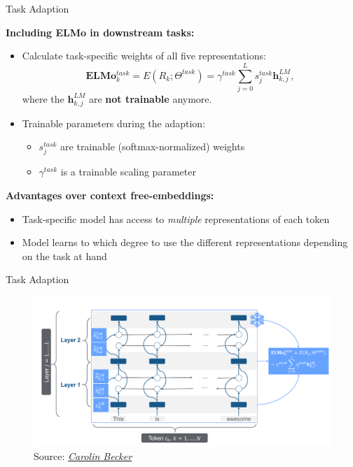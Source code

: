 \begin{vbframe}{Task Adaption}

\vfill

\textbf{Including ELMo in downstream tasks:}

	\begin{itemize}
		\item Calculate task-specific weights of all five representations:
					$$\mathbf{E} \mathbf{L} \mathbf{M} \mathbf{o}_{k}^{t a s k}=E\left(R_{k} ; \Theta^{t a s k}\right)=\gamma^{t a s k} \sum_{j=0}^{L} s_{j}^{t a s k} \mathbf{h}_{k, j}^{L M},$$
					where the $\mathbf{h}_{k, j}^{L M}$ are \textbf{not trainable} anymore.
		\item Trainable parameters during the adaption:
			\begin{itemize}
				\item $s_{j}^{t a s k}$ are trainable (softmax-normalized) weights
				\item $\gamma^{t a s k}$ is a trainable scaling parameter
			\end{itemize}
	\end{itemize}

	\textbf{Advantages over context free-embeddings:}

	\begin{itemize}
		\item Task-specific model has access to \textit{multiple} representations of each token
		\item Model learns to which degree to use the different representations depending on the task at hand
	\end{itemize}

\vfill

\end{vbframe}


\begin{vbframe}{Task Adaption}

\vfill

	\begin{figure}
		\centering
		\includegraphics[width = 12cm]{figure/elmo-adaption}\\ 
		\footnotesize{Source:} \href{https://slds-lmu.github.io/seminar_nlp_ss20/transfer-learning-for-nlp-i.html}{\footnotesize \it Carolin Becker}
	\end{figure}

\vfill

\end{vbframe}

